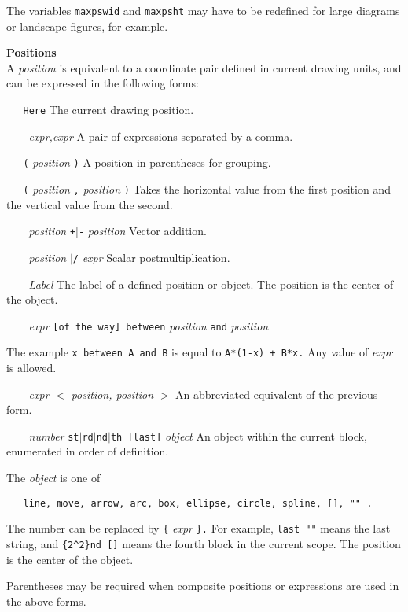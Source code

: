 The variables
{\tt maxpswid}
and
{\tt maxpsht}
may have to be redefined for large diagrams or
landscape figures, for example.
\par\hskip-2pc{\bf Positions}\\
A
{\it position}
is equivalent to a coordinate pair defined in current drawing units,
and can be expressed in the following forms:

{\tt \ \ \ Here}
   The current drawing position.

{\it \ \ \ \ expr,expr}
   A pair of expressions separated by a comma.

{\tt \ \ \ (}
{\it position}
{\tt )}
   A position in parentheses for grouping.

{\tt \ \ \ (}
{\it position}
{\tt ,}
{\it position}
{\tt )}
   Takes the horizontal value from the first position and
   the vertical value from the second.

{\it \ \ \ \ position}
{\tt +$|$-}
{\it position}
   Vector addition.

{\it \ \ \ \ position}
{\tt *$|$/}
{\it expr}
   Scalar postmultiplication.

{\it \ \ \ \ Label}
   The label of a defined position or object.
The position
   is the center of the object.

{\it \ \ \ \ expr}
{\tt [of\ the\ way]\ between}
{\it position}
{\tt and}
{\it position}

   The example
{\tt x\ between\ A\ and\ B}
is equal to
{\tt A*(1-x)\ +\ B*x.}
   Any value of
{\it expr}
is allowed.

{\it \ \ \ \ expr}
{\tt $<$}
{\it position, position}
{\tt $>$}
   An abbreviated equivalent of the previous form.

{\it \ \ \ \ number}
{\tt st$|$rd$|$nd$|$th\ [last]}
{\it object}
   An object within the current block, enumerated in order of definition.

   The
{\it object}
is one of

{\tt \ \ \ line,\ move,\ arrow,\ arc,\ box,\ ellipse,\ circle,\ spline,\ [],\ {\tt "}{\tt "} .}

The number can be replaced by
{\tt \{}
{\it expr}
{\tt \}.}
For example,
{\tt last {\tt "}{\tt "}}
means the last string, and
{\tt \{2\^{}2\}nd\ []}
means the fourth block in the current scope.
The position is the center of the object.

Parentheses may be required when composite positions or expressions
are used in the above forms.

